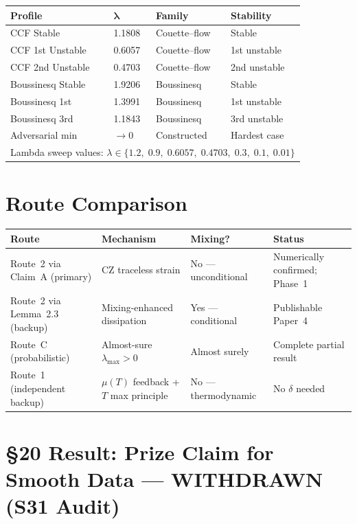 \documentclass[11pt, a4paper]{article}
\theoremstyle{definition}
\theoremstyle{remark}
\newcommand{\lam}{\lambda}
\newcommand{\delt}{\delta}
\begin{document}
\begin{center}
\begin{tabular}{llll}
\toprule
\textbf{Profile} & $\boldsymbol{\lam}$ & \textbf{Family} & \textbf{Stability} \\
\midrule
CCF Stable       & 1.1808 & Couette--flow & Stable \\
CCF 1st Unstable & 0.6057 & Couette--flow & 1st unstable \\
CCF 2nd Unstable & 0.4703 & Couette--flow & 2nd unstable \\
Boussinesq Stable & 1.9206 & Boussinesq & Stable \\
Boussinesq 1st    & 1.3991 & Boussinesq & 1st unstable \\
Boussinesq 3rd    & 1.1843 & Boussinesq & 3rd unstable \\
Adversarial min   & $\to 0$ & Constructed & Hardest case \\
\midrule
\multicolumn{4}{l}{Lambda sweep values: $\lam \in \{1.2,\; 0.9,\; 0.6057,\; 0.4703,\; 0.3,\; 0.1,\; 0.01\}$} \\
\bottomrule
\end{tabular}
\end{center}

\section{Route Comparison}
\label{app:routes}

\begin{center}
\begin{tabular}{llll}
\toprule
\textbf{Route} & \textbf{Mechanism} & \textbf{Mixing?} & \textbf{Status} \\
\midrule
Route~2 via Claim~A (primary) & CZ traceless strain & No --- unconditional & Numerically confirmed; Phase~1 \\
Route~2 via Lemma~2.3 (backup) & Mixing-enhanced dissipation & Yes --- conditional & Publishable Paper~4 \\
Route~C (probabilistic) & Almost-sure $\lambda_{\max} > 0$ & Almost surely & Complete partial result \\
Route~1 (independent backup) & $\mu(T)$ feedback + $T$ max principle & No --- thermodynamic & No $\delt$ needed \\
\bottomrule
\end{tabular}
\end{center}

\section{\S20 Result: Prize Claim for Smooth Data --- WITHDRAWN (S31 Audit)}
\label{sec:s20}
\end{document}
